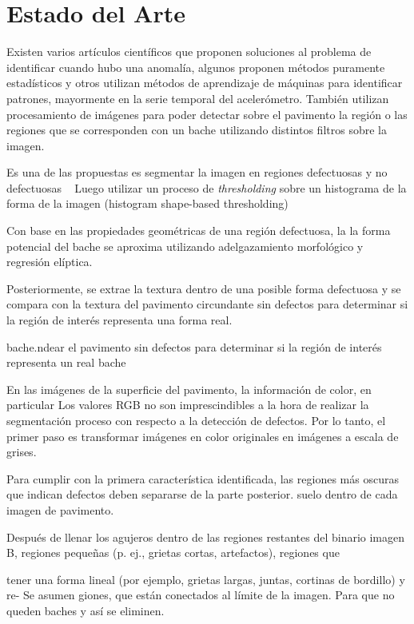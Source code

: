 \chapter{Estado del Arte}\label{chapter:state-of-the-art}

Existen varios artículos científicos que proponen soluciones al problema de identificar cuando hubo una anomalía, algunos proponen métodos
puramente estadísticos y otros utilizan métodos de aprendizaje de máquinas para identificar patrones, mayormente en la serie temporal del
acelerómetro. También utilizan procesamiento de imágenes para poder detectar sobre el pavimento la región o las regiones que se corresponden
con un bache utilizando distintos filtros sobre la imagen.


Es una de las propuestas es segmentar la  imagen en regiones defectuosas y no defectuosas ~\parencite{koch2011pothole}
Luego utilizar un proceso de  \emph{thresholding} sobre un histograma de la forma de la imagen (histogram shape-based thresholding)

Con base en las propiedades geométricas de una región defectuosa, la
la forma potencial del bache se aproxima utilizando adelgazamiento morfológico y regresión elíptica.~\parencite{koch2011pothole}


Posteriormente, se extrae la textura dentro de una posible forma defectuosa y se compara con la textura del pavimento circundante 
sin defectos para determinar si la región de interés representa una forma real.

bache.ndear el pavimento sin defectos para determinar si la región de interés representa un real bache

En las imágenes de la superficie del pavimento, la información de color, en particular
Los valores RGB no son imprescindibles a la hora de realizar la segmentación proceso con respecto a 
la detección de defectos. Por lo tanto, el primer paso es transformar imágenes en color originales en 
imágenes a escala de grises.

Para cumplir con la primera característica identificada, las regiones más oscuras que indican defectos deben separarse de la parte posterior.
suelo dentro de cada imagen de pavimento.

Después de llenar los agujeros dentro de las regiones restantes del binario
imagen B, regiones pequeñas (p. ej., grietas cortas, artefactos), regiones que

tener una forma lineal (por ejemplo, grietas largas, juntas, cortinas de bordillo) y re-
Se asumen giones, que están conectados al límite de la imagen.
Para que no queden baches y así se eliminen.



